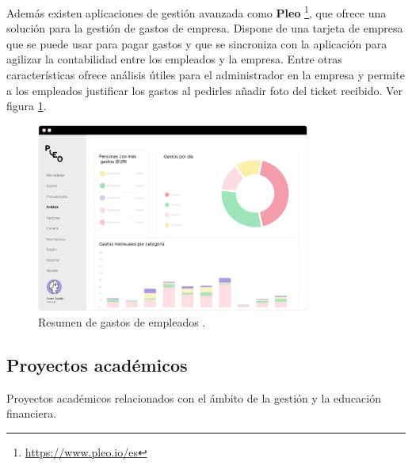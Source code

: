 Además existen aplicaciones de gestión avanzada como \textbf{Pleo} 
\footnote{\url{https://www.pleo.io/es}}, que ofrece una solución para la gestión 
de gastos de empresa. Dispone de una tarjeta 
de empresa que se puede usar para pagar gastos y que se sincroniza con la aplicación 
para agilizar la contabilidad entre los empleados y la empresa. 
Entre otras características ofrece análisis útiles para el administrador en la empresa 
y permite a los empleados justificar los gastos al pedirles añadir foto del ticket recibido. 
Ver figura \ref{fig:resumen_gastos_pleo}.
\begin{figure}[ht!]
    \centering
    \includegraphics[width = 90mm]{imagenes/resumen-gastos-pleo.png}
    \caption{Resumen de gastos de empleados \cite{gastos-pleo}.}
    \label{fig:resumen_gastos_pleo}
\end{figure}


\subsection{Proyectos académicos}
Proyectos académicos relacionados con el ámbito de la gestión y la educación financiera.

